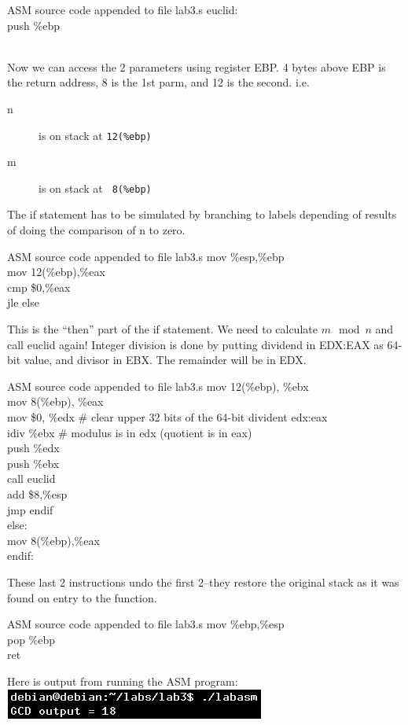 \documentclass{article}
\begin{document}
\begin{GFT}{ASM source code appended to file lab3.s}
\+euclid:\\
\+push \%ebp\\
\+\\
\end{GFT}
Now we can access the 2 parameters using register EBP. 4 bytes above EBP is the return address, 8 is the 1st parm, and 12 is the second. i.e.
\begin{description}
\item[n] is on stack at \verb|12(%ebp)|
\item[m] is on stack at \verb| 8(%ebp)|
\end{description}
The if statement has to be simulated by branching to labels depending of results of doing the comparison of n to zero.
\begin{GFT}{ASM source code appended to file lab3.s}
\+mov \%esp,\%ebp\\
\+mov 12(\%ebp),\%eax\\
\+cmp \$0,\%eax\\
\+jle else\\
\end{GFT}
This is the ``then'' part of the if statement. We need to calculate $m \mod n$ and call euclid again!  Integer division is done by putting dividend in EDX:EAX as 64-bit value, and divisor in EBX. The remainder will be in EDX.
\begin{GFT}{ASM source code appended to file lab3.s}
\+mov 12(\%ebp), \%ebx\\
\+mov 8(\%ebp), \%eax\\
\+mov \$0, \%edx \# clear upper 32 bits of the 64-bit divident edx:eax\\
\+idiv \%ebx \# modulus is in edx (quotient is in eax)\\
\+push  \%edx\\
\+push \%ebx\\
\+call euclid\\
\+add \$8,\%esp\\
\+jmp endif\\
\+else:\\
\+mov 8(\%ebp),\%eax\\
\+endif: \\
\end{GFT}
\clearpage
These last 2 instructions undo the first 2--they restore the original stack as it was found on entry to the function.
\begin{GFT}{ASM source code appended to file lab3.s}
\+mov \%ebp,\%esp\\
\+pop \%ebp\\
\+ret \\
\end{GFT}
Here is output from running the ASM program:\\
\includegraphics[scale=0.8]{asmfinal.png}
\clearpage
\end{document}
